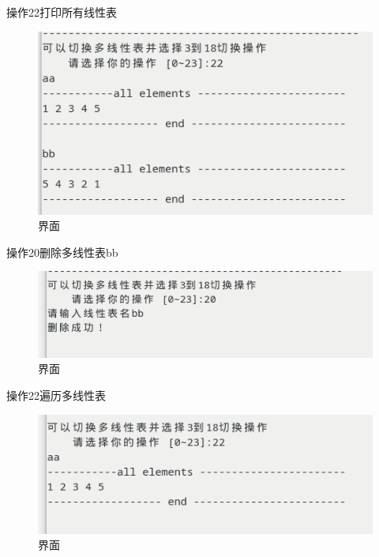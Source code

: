 \documentclass[supercite]{Experimental_Report}
\theoremstyle{definition}
\begin{document}
操作22打印所有线性表

\begin{figure}[!htb]
	\begin{center}
		\includegraphics[scale=0.60]{images/1-35.png}
		\caption{界面}
		\label{fig1-35}
		\end{center}
\end{figure}

操作20删除多线性表bb

\begin{figure}[!htb]
	\begin{center}
		\includegraphics[scale=0.60]{images/1-36.png}
		\caption{界面}
		\label{fig1-36}
		\end{center}
\end{figure}

操作22遍历多线性表

\begin{figure}[!htb]
	\begin{center}
		\includegraphics[scale=0.60]{images/1-37.png}
		\caption{界面}
		\label{fig1-37}
		\end{center}
\end{figure}
\end{document}
